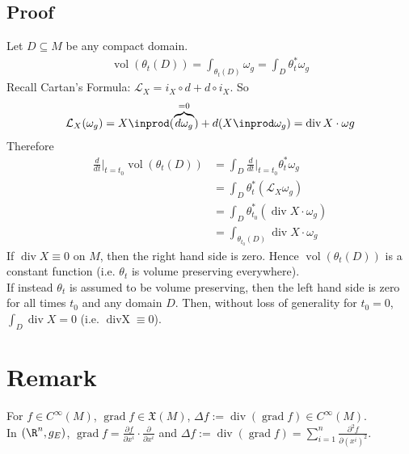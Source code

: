 \documentclass[11pt]{article}
\begin{document}
\subsection*{Proof}
\label{sec:orgef13d00}
Let \(D\subseteq M\) be any compact domain.\\
\begin{align*}
  \operatorname{vol}(\theta_{t}(D))
  =\int_{\theta_{t}(D)}\omega_{g}
  =\int_{D}\theta^{*}_{t}\omega_{g}
\end{align*}
Recall Cartan's Formula: \(\mathcal{L}_{X}=i_{X}\circ d+ d\circ i_{X}\). So\\
\begin{align*}
  \mathcal{L}_{X}(\omega_{g})
  =X\inprod(\overbrace{d\omega_{g}}^{=0})+d(X\inprod\omega_{g})
  =\operatorname{div}X\cdot\omega g
\end{align*}
Therefore\\
\begin{align*}
  \frac{d}{dt}\Big|_{t=t_{0}}\operatorname{vol}(\theta_{t}(D))
  &=\int_{D}\frac{d}{dt}\Big|_{t=t_{0}}\theta_{t}^{*}\omega_{g} \\
  &=\int_{D}\theta_{t}^{*}(\mathcal{L}_{X}\omega_{g}) \\
  &=\int_{D}\theta_{t_{0}}^{*}(\operatorname{div}X\cdot\omega_{g}) \\
  &=\int_{\theta_{t_{0}}(D)}\operatorname{div}X\cdot\omega_{g}
\end{align*}
If \(\operatorname{div}X\equiv 0\) on \(M\), then the right hand side is zero. Hence \(\operatorname{vol}(\theta_{t}(D))\) is a constant function (i.e. \(\theta_{t}\) is volume preserving everywhere).\\
If instead \(\theta_{t}\) is assumed to be volume preserving, then the left hand side is zero for all times \(t_{0}\) and any domain \(D\). Then, without loss of generality for \(t_{0}=0\), \(\int_{D}\operatorname{div}X= 0\) (i.e. \(\operatorname{div X}\equiv 0\)).\\
\section*{Remark}
\label{sec:org8c0c192}
For \(f\in C^{\infty}(M)\), \(\operatorname{grad}f\in\mathfrak{X}(M)\), \(\Delta f:=\operatorname{div}(\operatorname{grad}f)\in C^{\infty}(M)\).\\
In \((\R^{n},g_{E})\), \(\operatorname{grad}f=\frac{\partial f}{\partial x^{i}}\cdot\frac{\partial}{\partial x^{i}}\) and \(\Delta f:=\operatorname{div}(\operatorname{grad}f)=\sum_{i=1}^{n}\frac{\partial^{2}f}{\partial(x^{i})^{2}}\).\\
\end{document}
